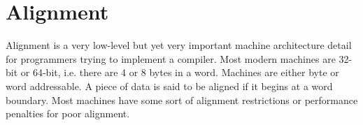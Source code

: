 \section{Alignment}
Alignment is a very low-level but yet very important machine architecture detail for programmers trying to implement a compiler. Most modern machines are 32-bit or 64-bit, i.e. there are 4 or 8 bytes in a word. Machines are either byte or word addressable. A piece of data is said to be aligned if it begins at a word boundary. Most machines have some sort of alignment restrictions or performance penalties for poor alignment. 

\ifx\PREAMBLE\undefined

\fi